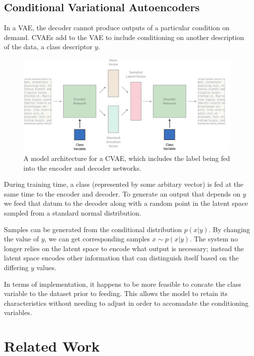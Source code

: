 \documentclass[12pt,twoside]{report}
\begin{document}
\subsection{Conditional Variational Autoencoders}
\label{conditional_variational_autoencoders}
In a VAE, the decoder cannot produce outputs of a particular condition on demand. CVAEs add to the VAE to include conditioning on another description of the data, a class descriptor $y$. 

\begin{figure}[!ht]
	\centering
	\includegraphics[width=150mm]{diagrams/conditional_variational_autoencoders.pdf}
	\caption{A model architecture for a CVAE, which includes the label being fed into the encoder and decoder networks. \label{cvae_diagram}}
\end{figure}

During training time, a class (represented by some arbitary vector) is fed at the same time to the encoder and decoder. To generate an output that depends on $y$ we feed that datum to the decoder along with a random point in the latent space sampled from a standard normal distribution.

Samples can be generated from the conditional distribution $p(x|y)$. By changing the value of $y$, we can get corresponding samples $x \sim p(x|y)$. The system no longer relies on the latent space to encode what output is necessary; instead the latent space encodes other information that can distinguish itself based on the differing $y$ values.

In terms of implementation, it happens to be more feasible to concate the class variable to the dataset prior to feeding. This allows the model to retain its characteristics without needing to adjust in order to accomadate the conditioning variables.

\section{Related Work}
\end{document}
